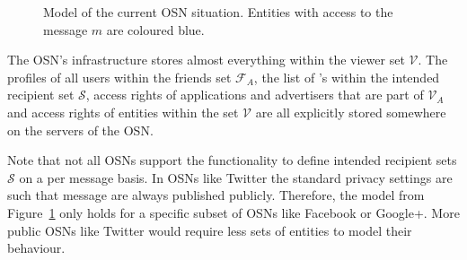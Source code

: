 \begin{figure}
\begin{center}
{
    }
    \end{center}
    \caption{Model of the current OSN situation. Entities with access to the message $m$ are coloured blue.}
    \label{fig:current_model}
\end{figure}

The OSN's infrastructure stores almost everything within the viewer set $\mathcal{V}$. The profiles of all users within the friends set $\mathcal{F}_A$, the list of \id{}'s within the intended recipient set $\mathcal{S}$, access rights of applications and advertisers that are part of $\mathcal{V}_A$ and access rights of entities within the set $\mathcal{V}$ are all explicitly stored somewhere on the servers of the OSN.

Note that not all OSNs support the functionality to define intended recipient sets $\mathcal{S}$ on a per message basis. In OSNs like Twitter the standard privacy settings are such that message are always published publicly. Therefore, the model from Figure~\ref{fig:current_model} only holds for a specific subset of OSNs like Facebook or Google+. More public OSNs like Twitter would require less sets of entities to model their behaviour.

